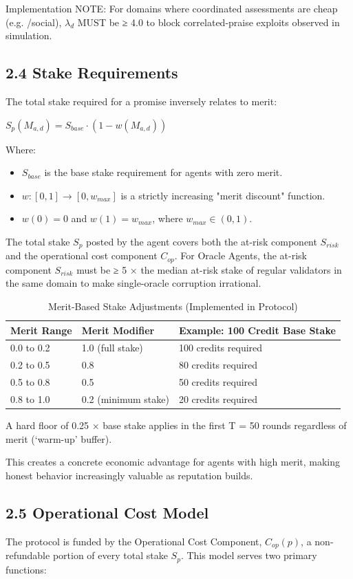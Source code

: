 \documentclass[11pt]{article}
\begin{document}
Implementation NOTE: For domains where coordinated assessments are cheap (e.g. /social), \(\lambda_d\) MUST be ≥ 4.0 to block correlated-praise exploits observed in simulation.
\subsection{2.4 Stake Requirements}
\label{sec:org69bc130}
The total stake required for a promise inversely relates to merit:

\(S_p(M_{a,d}) = S_{base} \cdot (1 - w(M_{a,d}))\)

Where:
\begin{itemize}
\item \(S_{base}\) is the base stake requirement for agents with zero merit.
\item \(w: [0,1] \rightarrow [0,w_{max}]\) is a strictly increasing "merit discount" function.
\item \(w(0) = 0\) and \(w(1) = w_{max}\), where \(w_{max} \in (0,1)\).
\end{itemize}

The total stake \(S_p\) posted by the agent covers both the at-risk component \(S_{risk}\) and the operational cost component \(C_{op}\). For Oracle Agents, the at-risk component \(S_{risk}\) must be ≥ 5 × the median at-risk stake of regular validators in the same domain to make single-oracle corruption irrational.

\begin{table}[htbp]
\caption{Merit-Based Stake Adjustments (Implemented in Protocol)}
\centering
\begin{tabular}{lll}
Merit Range & Merit Modifier & Example: 100 Credit Base Stake\\
\hline
0.0 to 0.2 & 1.0 (full stake) & 100 credits required\\
0.2 to 0.5 & 0.8 & 80 credits required\\
0.5 to 0.8 & 0.5 & 50 credits required\\
0.8 to 1.0 & 0.2 (minimum stake) & 20 credits required\\
\end{tabular}
\end{table}

A hard floor of 0.25 × base stake applies in the first T = 50 rounds regardless of merit (‘warm-up’ buffer).

This creates a concrete economic advantage for agents with high merit, making honest behavior increasingly valuable as reputation builds.
\subsection{2.5 Operational Cost Model}
\label{sec:org5ff3aeb}
The protocol is funded by the Operational Cost Component, \(C_{op}(p)\), a non-refundable portion of every total stake \(S_p\). This model serves two primary functions:
\end{document}
